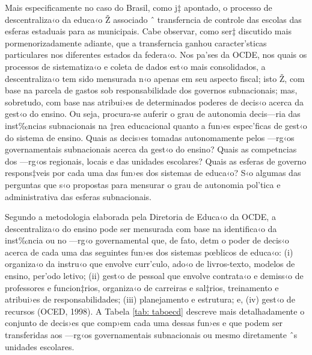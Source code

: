 \documentclass[a4paper, 12pt]{article}
\begin{document}
Mais especificamente no caso do Brasil, como j‡ apontado, o processo de descentraliza‹o da educa‹o Ž associado ˆ transferncia de controle das escolas das esferas estaduais para as municipais. Cabe observar, como ser‡ discutido mais pormenorizadamente adiante, que a transferncia ganhou caracter’sticas particulares nos diferentes estados da federa‹o. 
Nos pa’ses da OCDE, nos quais os processos de sistematiza‹o e coleta de dados est‹o mais consolidados, a descentraliza‹o tem sido mensurada n‹o apenas em seu aspecto fiscal; isto Ž, com base na parcela de gastos sob responsabilidade dos governos subnacionais; mas, sobretudo, com base nas atribui›es de determinados poderes de decis‹o acerca da gest‹o do ensino. Ou seja, procura-se auferir o grau de autonomia decis—ria das inst‰ncias subnacionais na ‡rea educacional quanto a fun›es espec’ficas de gest‹o do sistema de ensino. Quais as decis›es tomadas autonomamente pelos —rg‹os governamentais subnacionais acerca da gest‹o do ensino? Quais as competncias dos —rg‹os regionais, locais e das unidades escolares? Quais as esferas de governo respons‡veis por cada uma das fun›es dos sistemas de educa‹o? S‹o algumas das perguntas que s‹o propostas para mensurar o grau de autonomia pol’tica e administrativa das esferas subnacionais.

Segundo a metodologia elaborada pela Diretoria de Educa‹o da OCDE, a descentraliza‹o do ensino pode ser mensurada com base na identifica‹o da inst‰ncia ou no —rg‹o governamental que, de fato, detm o poder de decis‹o acerca de cada uma das seguintes fun›es dos sistemas pœblicos de educa‹o: (i) organiza‹o da instru‹o que envolve curr’culo, ado‹o de livros-texto, modelos de ensino, per’odo letivo; (ii) gest‹o de pessoal que envolve contrata‹o e demiss‹o de professores e funcion‡rios, organiza‹o de carreiras e sal‡rios, treinamento e atribui›es de responsabilidades; (iii) planejamento e estrutura; e, (iv) gest‹o de recursos (OCED, 1998).  A Tabela \ref{tab: taboecd} descreve mais detalhadamente o conjunto de decis›es que comp›em cada uma dessas fun›es e que podem ser transferidas aos —rg‹os governamentais subnacionais ou mesmo diretamente ˆs unidades escolares. 

\end{document}
